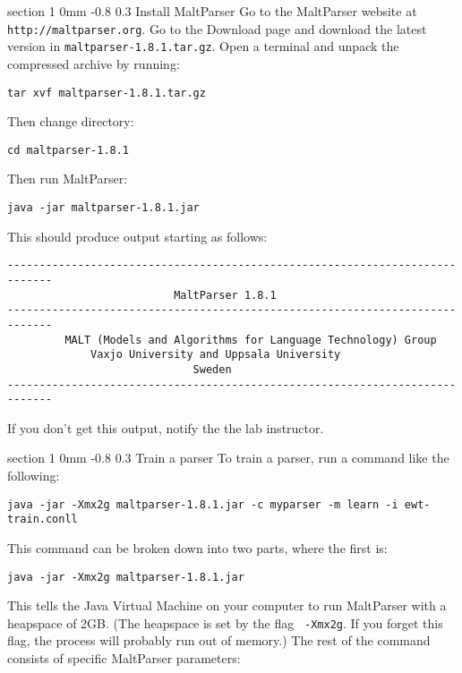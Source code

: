 \documentclass[10.9pt]{article}
\makeatletter
\newcommand{\newsec}[2]{\section{#1}\label{sec:#2}\noindent}
\renewcommand{\section}{\@startsection
{section}%
{1}%
{0mm}%
{-0.8\baselineskip}%
{0.3\baselineskip}%
{\bfseries\large}}%
\makeatother
\begin{document}
\newsec{Install MaltParser}{malt}%
Go to the MaltParser website at {\tt http://maltparser.org}. Go to the Download page and download the latest version in {\tt maltparser-1.8.1.tar.gz}. Open a terminal and unpack the compressed archive by running:
\begin{small}
\begin{verbatim}
tar xvf maltparser-1.8.1.tar.gz
\end{verbatim}
\end{small}
Then change directory:
\begin{small}
\begin{verbatim}
cd maltparser-1.8.1
\end{verbatim}
\end{small}
Then run MaltParser:
\begin{small}
\begin{verbatim}
java -jar maltparser-1.8.1.jar
\end{verbatim}
\end{small}
This should produce output starting as follows:
\begin{small}
\begin{verbatim}
-----------------------------------------------------------------------------
                          MaltParser 1.8.1                             
-----------------------------------------------------------------------------
         MALT (Models and Algorithms for Language Technology) Group          
             Vaxjo University and Uppsala University                         
                             Sweden                                          
-----------------------------------------------------------------------------
\end{verbatim}
\end{small}
If you don't get this output, notify the the lab instructor.

\clearpage
\newsec{Train a parser}{train}%
To train a parser, run a command like the following:
\begin{small}
\begin{verbatim}
java -jar -Xmx2g maltparser-1.8.1.jar -c myparser -m learn -i ewt-train.conll 
\end{verbatim}
\end{small}
This command can be broken down into two parts, where the first is:
\begin{small}
\begin{verbatim}
java -jar -Xmx2g maltparser-1.8.1.jar
\end{verbatim}
\end{small}
This tells the Java Virtual Machine on your computer to run MaltParser
with a heapspace of 2GB. (The heapspace is set by the flag {\tt
  -Xmx2g}. If you forget this flag, the process will probably run out
of memory.)  The rest of the command consists of specific MaltParser
parameters:
\end{document}
